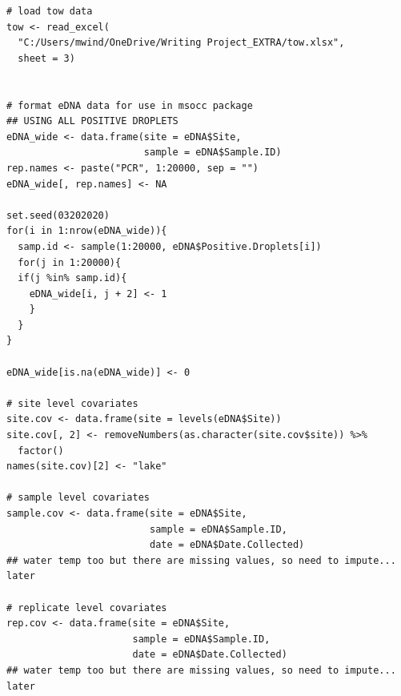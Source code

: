 \documentclass[12pt]{article}\usepackage[]{graphicx}\usepackage[]{color}
\makeatletter
\newenvironment{kframe}{%
 \def\at@end@of@kframe{}%
 \ifinner\ifhmode%
  \def\at@end@of@kframe{\end{minipage}}%
  \begin{minipage}{\columnwidth}%
 \fi\fi%
 \def\FrameCommand##1{\hskip\@totalleftmargin \hskip-\fboxsep
 \colorbox{shadecolor}{##1}\hskip-\fboxsep
     \hskip-\linewidth \hskip-\@totalleftmargin \hskip\columnwidth}%
 \MakeFramed {\advance\hsize-\width
   \@totalleftmargin\z@ \linewidth\hsize
   \@setminipage}}%
 {\par\unskip\endMakeFramed%
 \at@end@of@kframe}
\newenvironment{knitrout}{}{} %
\newenvironment{kframe}{%
 \def\at@end@of@kframe{}%
 \ifinner\ifhmode%
  \def\at@end@of@kframe{\end{minipage}}%
  \begin{minipage}{\columnwidth}%
 \fi\fi%
 \def\FrameCommand##1{\hskip\@totalleftmargin \hskip-\fboxsep
 \colorbox{shadecolor}{##1}\hskip-\fboxsep
     \hskip-\linewidth \hskip-\@totalleftmargin \hskip\columnwidth}%
 \MakeFramed {\advance\hsize-\width
   \@totalleftmargin\z@ \linewidth\hsize
   \@setminipage}}%
 {\par\unskip\endMakeFramed%
 \at@end@of@kframe}
\newenvironment{knitrout}{}{} %
\makeatother
\begin{document}
\begin{knitrout}
\begin{kframe}
\begin{verbatim}
# load tow data
tow <- read_excel(
  "C:/Users/mwind/OneDrive/Writing Project_EXTRA/tow.xlsx",
  sheet = 3)


# format eDNA data for use in msocc package
## USING ALL POSITIVE DROPLETS
eDNA_wide <- data.frame(site = eDNA$Site, 
                        sample = eDNA$Sample.ID)
rep.names <- paste("PCR", 1:20000, sep = "")
eDNA_wide[, rep.names] <- NA

set.seed(03202020)
for(i in 1:nrow(eDNA_wide)){
  samp.id <- sample(1:20000, eDNA$Positive.Droplets[i])
  for(j in 1:20000){
  if(j %in% samp.id){
    eDNA_wide[i, j + 2] <- 1
    }
  }
}

eDNA_wide[is.na(eDNA_wide)] <- 0

# site level covariates
site.cov <- data.frame(site = levels(eDNA$Site))
site.cov[, 2] <- removeNumbers(as.character(site.cov$site)) %>%
  factor()
names(site.cov)[2] <- "lake"

# sample level covariates
sample.cov <- data.frame(site = eDNA$Site, 
                         sample = eDNA$Sample.ID, 
                         date = eDNA$Date.Collected)
## water temp too but there are missing values, so need to impute... later
  
# replicate level covariates
rep.cov <- data.frame(site = eDNA$Site, 
                      sample = eDNA$Sample.ID, 
                      date = eDNA$Date.Collected)
## water temp too but there are missing values, so need to impute... later
\end{verbatim}
\end{kframe}
\end{knitrout}


\end{document}
